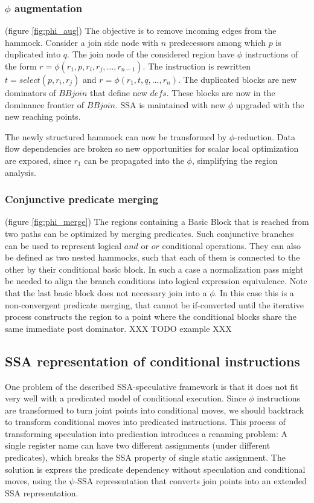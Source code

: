 \subsubsection{$\phi$ augmentation} (figure \ref{fig:phi_aug})
The objective is to remove incoming edges from the hammock. Consider a join side node with $n$ predecessors among which $p$ is duplicated into $q$.  The join node of the considered region have $\phi$ instructions of the form $r=\phi(r_1,p,r_i,r_j,\dots,r_{n-1})$. The instruction is rewritten $t=select(p,r_i,r_j)$ and \mbox{$r=\phi(r_1,t,q,\dots,r_n)$}. 
The duplicated blocks are new dominators of $BBjoin$ that define new $defs$. These blocks are now in the dominance frontier of $BBjoin$. SSA is maintained with new $\phi$ upgraded with the new reaching points.

The newly structured hammock can now be transformed by $\phi$-reduction. Data flow dependencies are broken so new opportunities for scalar local optimization are exposed, since $r_1$ can be propagated into the $\phi$, simplifying the region analysis.

\subsubsection{Conjunctive predicate merging} (figure \ref{fig:phi_merge})
The regions containing a Basic Block that is reached from two paths can be optimized by merging predicates. Such conjunctive branches can be used to represent logical $and$ or $or$ conditional operations. They can also be defined as two nested hammocks, such that each of them is connected to the other by their conditional basic block. In such a case a normalization pass might be needed to align the branch conditions into logical expression equivalence. Note that the last basic block does not necessary join into a $\phi$. In this case this is a non-convergent predicate merging, that cannot be if-converted until the iterative process constructs the region to a point where the conditional blocks share the same immediate post dominator. XXX TODO example XXX

\subsection{SSA representation of conditional instructions}

One problem of the described SSA-speculative framework is that it does not fit very well with a predicated model of conditional execution. Since $\phi$ instructions are transformed to turn joint points into conditional moves, we should backtrack to transform conditional moves into predicated instructions. This process of transforming speculation into predication introduces a renaming problem: A single register name can have two different assignments (under different predicates), which breaks the SSA property of single static assignment. The solution is express the predicate dependency without speculation and conditional moves, using the $\psi$-SSA representation that converts join points into an extended SSA representation.

